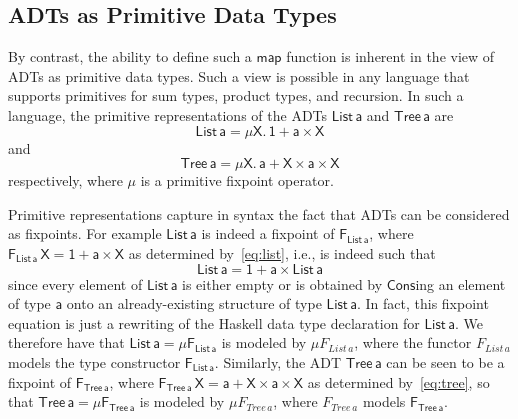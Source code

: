\documentclass[acmsmall,screen,review,anonymous]{acmart}
\theoremstyle{definition}
\begin{document}
\subsection{ADTs as Primitive Data Types}

By contrast, the ability to define such a $\mathsf{map}$ function is
inherent in the view of ADTs as primitive data types. Such a view is
possible in any language that supports primitives for sum types,
product types, and recursion. In such a language, the primitive
representations of the ADTs $\mathsf{List\,a}$ and $\mathsf{Tree\,a}$
are
\begin{equation}\label{eq:list}
  \mathsf{List\,a} = \mathsf{\mu X.\, 1 + a \times X}
\end{equation}
and 
\begin{equation}\label{eq:tree}
  \mathsf{Tree\,a} = \mathsf{\mu X.\, a + X \times a \times X}
\end{equation}
respectively, where $\mathsf{\mu}$ is a primitive fixpoint operator.

Primitive representations capture in syntax the fact that ADTs can be
considered as fixpoints. For example $\mathsf{List\,a}$ is indeed a
fixpoint of $\mathsf{F_{List\,a}}$, where $\mathsf{F_{List\,a}\,X} =
\mathsf{1 + a \times X}$ as determined by~\eqref{eq:list}, i.e., is
indeed such that
\[\mathsf{List\,a} = \mathsf{1 + a \times List\,a}\] 
since every element of $\mathsf{List\,a}$ is either empty or is
obtained by $\mathsf{Cons}$ing an element of type $\mathsf{a}$ onto an
already-existing structure of type $\mathsf{List\,a}$. In fact, this
fixpoint equation is just a rewriting of the Haskell data type
declaration for $\mathsf{List\,a}$. We therefore have that
$\mathsf{List\, a} = \mathsf{\mu F_{List\,a}}$ is modeled by $\mu
F_{\mathit{List}\,a}$, where the functor $F_{\mathit{List}\,a}$ models
the type constructor $\mathsf{F_{List\,a}}$. Similarly, the ADT
$\mathsf{Tree\,a}$ can be seen to be a fixpoint of
$\mathsf{F_{Tree\,a}}$, where $\mathsf{F_{Tree\,a}\,X} = \mathsf{a + X
  \times a \times X}$ as determined by~\eqref{eq:tree}, so that
$\mathsf{Tree\, a} = \mathsf{ \mu F_{Tree\,a}}$ is modeled by $\mu
F_{\mathit{Tree}\,a}$, where $F_{\mathit{Tree}\,a} $ models
$\mathsf{F_{Tree\,a}}$.
 
\end{document}
